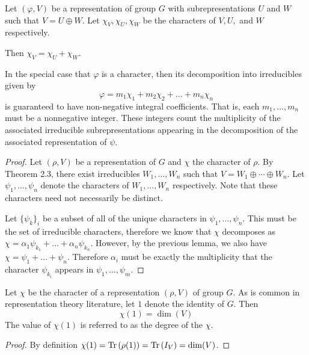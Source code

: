 \begin{lemma}
    Let $(\varphi, V)$ be a representation of group $G$ with subrepresentations $U$ and $W$ such that $V = U \oplus 
    W$. Let $\chi_V, \chi_U, \chi_W$ be the characters of $V, U,$ and $W$ respectively.

    Then $\chi_V = \chi_U + \chi_W$.
\end{lemma}

\begin{theorem}
    In the special case that $\varphi$ is a character, then its decomposition into irreducibles given by
    \[
        \varphi = m_1\chi_1 + m_2 \chi_2 + ... + m_n \chi_n
    \]
    is guaranteed to have non-negative integral coefficients. That is, each $m_1,...,m_n$ must be a nonnegative 
    integer. These integers count the multiplicity of the associated irreducible subrepresentations appearing in 
    the decomposition of the associated representation of $\psi$.
\end{theorem}

\begin{proof}
    Let $(\rho, V)$ be a representation of $G$ and $\chi$ the character of $\rho$. By Theorem 2.3, there exist 
    irreducibles $W_1, ..., W_n$ such that $V = W_1 \oplus \cdots \oplus W_n$. Let $\psi_1, ..., \psi_n$ denote the 
    characters of $W_1, ..., W_n$ respectively. Note that these characters need not necessarily be distinct.

Let $\{\psi_k\}_i$ be a subset of all of the unique characters in $\psi_1, ..., \psi_n$. This must be the set of 
irreducible characters, therefore we know that $\chi$ decomposes as $\chi = \alpha_1\psi_{k_1} + ... + 
\alpha_n\psi_{k_n}$.  However, by the previous lemma, we also have $\chi = \psi_1 + ... +  \psi_n$. Therefore 
$\alpha_i$ must be exactly the multiplicity that the character $\psi_{k_i}$ appears in $\psi_1, ..., \psi_m$.
\end{proof}

\begin{proposition}
    Let $\chi$ be the character of a representation $(\rho, V)$ of group $G$. As is common in representation theory 
    literature, let $1$ denote the identity of $G$. Then
    \[
        \chi(1) = \dim(V)
    \]
    The value of $\chi(1)$ is referred to as the degree of the $\chi$.
\end{proposition}

\begin{proof}
    By definition $\chi(1) = \text{Tr}\,(\rho(1)) = \text{Tr}\,(I_V) =  \dim(V)$.
\end{proof}


